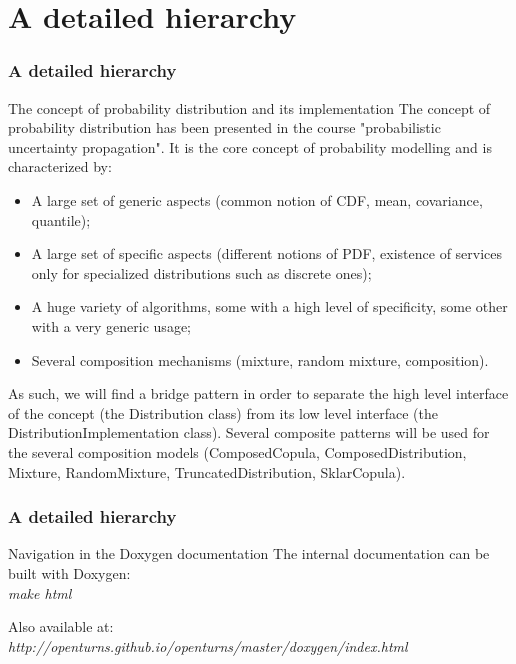 \documentclass[8pt]{beamer}
\begin{document}
\section[A detailed hierarchy]{A detailed hierarchy}
\begin{frame}
  \frametitle{A detailed hierarchy}
  \begin{block}{The concept of probability distribution and its implementation}
    The concept of probability distribution has been presented in the course "probabilistic uncertainty propagation". It is the core concept of probability modelling and is characterized by:
    \begin{itemize}
    \item A large set of generic aspects (common notion of CDF, mean, covariance, quantile);
    \item A large set of specific aspects (different notions of PDF, existence of services only for specialized distributions such as discrete ones);
    \item A huge variety of algorithms, some with a high level of specificity, some other with a very generic usage;
    \item Several composition mechanisms (mixture, random mixture, composition).
    \end{itemize}
  \end{block}
  As such, we will find a bridge pattern in order to separate the \alert{high level interface} of the concept (the \alert{Distribution class}) from its \alert{low level interface} (the \alert{DistributionImplementation class}). Several composite patterns will be used for the several composition models (ComposedCopula, ComposedDistribution, Mixture, RandomMixture, TruncatedDistribution, SklarCopula).
\end{frame}
\begin{frame}
  \frametitle{A detailed hierarchy}
  \begin{block}{Navigation in the Doxygen documentation}
    The internal documentation can be built with Doxygen:\\
    \textit{make html}

    Also available at:\\
    \textit{http://openturns.github.io/openturns/master/doxygen/index.html}
  \end{block}
\end{frame}
\end{document}
